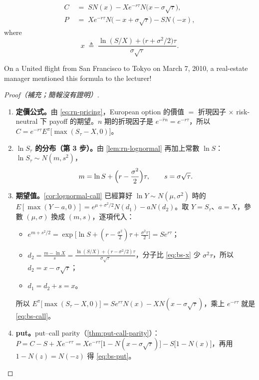 
\suppstart
{}
\suppend

\begin{theorem}
	\label{thm:black-scholes}
	\begin{align}
		C & \;=\; SN(x)-Xe^{-r\tau}N\bigl(x-\sigma\sqrt{\tau}\bigr) , \label{eq:bs-call} \\
		P & \;=\; Xe^{-r\tau}N\bigl(-x+\sigma\sqrt{\tau}\bigr)-SN(-x) , \label{eq:bs-put}
	\end{align}
	where
	\begin{equation}
		x \;\triangleq\; \frac{\ln(S/X)+\bigl(r+\sigma^{2}/2\bigr)\tau}{\sigma\sqrt{\tau}} .
		\label{eq:bs-x}
	\end{equation}
\end{theorem}

On a United flight from San Francisco to Tokyo on March 7, 2010, a real-estate manager mentioned this formula to the lecturer!

\suppstart
\begin{proof}[Proof（補充；簡報沒有證明）]
	\begin{enumerate}[(1),nosep]
		\item \textbf{定價公式。}由 \eqref{eq:rn-pricing}，European option 的價值 $=$ 折現因子 $\times$ risk-neutral 下 payoff 的期望。$n$ 期的折現因子是 $e^{-\hat{r}n}=e^{-r\tau}$，所以 $C=e^{-r\tau}E^{\pi}\bigl[\max(S_{\tau}-X,0)\bigr]$。
		\item \textbf{$\ln S_{\tau}$ 的分布（第 3 步）。}由 \autoref{lem:rn-lognormal} 再加上常數 $\ln S$：$\ln S_{\tau}\sim N(m,s^{2})$，
		\[
			m=\ln S+\Bigl(r-\frac{\sigma^{2}}{2}\Bigr)\tau ,
			\qquad
			s=\sigma\sqrt{\tau} .
		\]
		\item \textbf{期望值。}\autoref{cor:lognormal-call} 已經算好 $\ln Y\sim N(\mu,\sigma^{2})$ 時的 $E[\max(Y-a,0)]=e^{\mu+\sigma^{2}/2}N(d_{1})-aN(d_{2})$。取 $Y=S_{\tau}$、$a=X$，參數 $(\mu,\sigma)$ 換成 $(m,s)$，逐項代入：
		\begin{itemize}[nosep]
			\item $e^{m+s^{2}/2}=\exp\bigl[\ln S+(r-\frac{\sigma^{2}}{2})\tau+\frac{\sigma^{2}\tau}{2}\bigr]=Se^{r\tau}$；
			\item $d_{2}=\frac{m-\ln X}{s}=\frac{\ln(S/X)+(r-\sigma^{2}/2)\tau}{\sigma\sqrt{\tau}}$，分子比 \eqref{eq:bs-x} 少 $\sigma^{2}\tau$，所以 $d_{2}=x-\sigma\sqrt{\tau}$；
			\item $d_{1}=d_{2}+s=x$。
		\end{itemize}
		所以 $E^{\pi}\bigl[\max(S_{\tau}-X,0)\bigr]=Se^{r\tau}N(x)-XN(x-\sigma\sqrt{\tau})$，乘上 $e^{-r\tau}$ 就是 \eqref{eq:bs-call}。
		\item \textbf{put。}put--call parity（\autoref{thm:put-call-parity}）：$P=C-S+Xe^{-r\tau}=Xe^{-r\tau}\bigl[1-N(x-\sigma\sqrt{\tau})\bigr]-S\bigl[1-N(x)\bigr]$，再用 $1-N(z)=N(-z)$ 得 \eqref{eq:bs-put}。
	\end{enumerate}
\end{proof}

